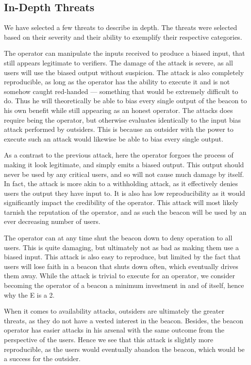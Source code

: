 \subsection{In-Depth Threats}
We have selected a few threats to describe in depth.
The threats were selected based on their severity and their ability to exemplify their respective categories.

The operator can manipulate the inputs received to produce a biased input, that still appears legitimate to verifiers.
The damage of the attack is severe, as all users will use the biased output without suspicion.
The attack is also completely reproducible, as long as the operator has the ability to execute it and is not somehow caught red-handed --- something that would be extremely difficult to do.
Thus he will theoretically be able to bias every single output of the beacon to his own benefit while still appearing as an honest operator.
The attacks does require being the operator, but otherwise evaluates identically to the input bias attack performed by outsiders.
This is because an outsider with the power to execute such an attack would likewise be able to bias every single output.

As a contrast to the previous attack, here the operator forgoes the process of making it look legitimate, and simply emits a biased output.
This output should never be used by any critical users, and so will not cause much damage by itself.
In fact, the attack is more akin to a withholding attack, as it effectively denies users the output they have input to.
It is also has low reproducibility as it would significantly impact the credibility of the operator.
This attack will most likely tarnish the reputation of the operator, and as such the beacon will be used by an ever decreasing number of users.

The operator can at any time shut the beacon down to deny operation to all users.
This is quite damaging, but ultimately not as bad as making them use a biased input.
This attack is also easy to reproduce, but limited by the fact that users will lose faith in a beacon that shuts down often, which eventually drives them away.
While the attack is trivial to execute for an operator, we consider becoming the operator of a beacon a minimum investment in and of itself, hence why the E is a 2.

When it comes to availability attacks, outsiders are ultimately the greater threats, as they do not have a vested interest in the beacon.
Besides, the beacon operator has easier attacks in his arsenal with the same outcome from the perspective of the users.
Hence we see that this attack is slightly more reproducible, as the users would eventually abandon the beacon, which would be a success for the outsider.
